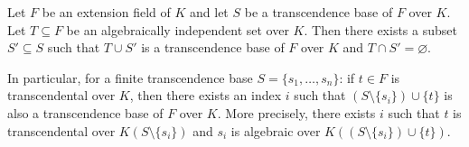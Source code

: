 Let $F$ be an extension field of $K$ and let $S$ be a transcendence base of $F$ over $K$.
Let $T \subseteq F$ be an algebraically independent set over $K$.
Then there exists a subset $S' \subseteq S$ such that $T \cup S'$ is a transcendence base of $F$ over $K$ and $T \cap S' = \varnothing$.

In particular, for a finite transcendence base $S = \{s_1, \ldots, s_n\}$:
if $t \in F$ is transcendental over $K$, then there exists an index $i$ such that $(S \setminus \{s_i\}) \cup \{t\}$ is also a transcendence base of $F$ over $K$.
More precisely, there exists $i$ such that $t$ is transcendental over $K(S \setminus \{s_i\})$ and $s_i$ is algebraic over $K((S \setminus \{s_i\}) \cup \{t\})$.

